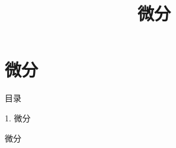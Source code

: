 \documentclass[aspectratio=169,10pt,fontset=fandol]{ctexbeamer}
\title{微分}
\begin{document}
\section{微分}
\begin{frame}[t,fragile]{目录}
\normalsize
{\color{blue}\normalsize 1. 微分\par}\vspace{0.22em}
\end{frame}
\begin{frame}[t,fragile]{微分}
\normalsize
{\normalsize
}
\end{frame}
\end{document}
